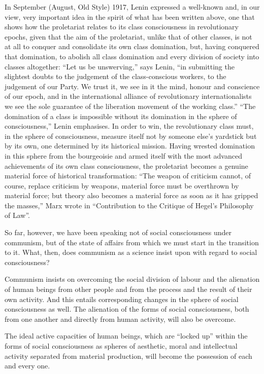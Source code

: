 \documentclass[../main]{subfiles}
\begin{document}
In September (August, Old Style) 1917, Lenin expressed a well-known and, in our view, very important idea in the spirit of what has been written above, one that shows how the proletariat relates to its class consciousness in revolutionary epochs, given that the aim of the proletariat, unlike that of other classes, is not at all to conquer and consolidate its own class domination, but, having conquered that domination, to abolish all class domination and every division of society into classes altogether: “Let us be unswerving,” says Lenin, “in submitting the slightest doubts to the judgement of the class-conscious workers, to the judgement of our Party. We trust it, we see in it the mind, honour and conscience of our epoch, and in the international alliance of revolutionary internationalists we see the sole guarantee of the liberation movement of the working class.” “The domination of a class is impossible without its domination in the sphere of consciousness,” Lenin emphasises. In order to win, the revolutionary class must, in the sphere of consciousness, measure itself not by someone else’s yardstick but by its own, one determined by its historical mission. Having wrested domination in this sphere from the bourgeoisie and armed itself with the most advanced achievements of its own class consciousness, the proletariat becomes a genuine material force of historical transformation: “The weapon of criticism cannot, of course, replace criticism by weapons, material force must be overthrown by material force; but theory also becomes a material force as soon as it has gripped the masses,” Marx wrote in “Contribution to the Critique of Hegel’s Philosophy of Law”.

So far, however, we have been speaking not of social consciousness under communism, but of the state of affairs from which we must start in the transition to it. What, then, does communism as a science insist upon with regard to social consciousness?

Communism insists on overcoming the social division of labour and the alienation of human beings from other people and from the process and the result of their own activity. And this entails corresponding changes in the sphere of social consciousness as well. The alienation of the forms of social consciousness, both from one another and directly from human activity, will also be overcome.

The ideal active capacities of human beings, which are “locked up” within the forms of social consciousness as spheres of aesthetic, moral and intellectual activity separated from material production, will become the possession of each and every one.
\end{document}
